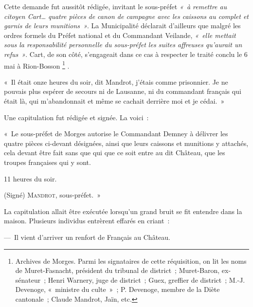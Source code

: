 \documentclass[french,twoside]{book} %
\newenvironment{quoteblock}%
  {\begin{quoting}}
  {\end{quoting}}
\newenvironment{quotebar}{%
    \def\FrameCommand{{\color{rubric!10!}\vrule width 0.5em} \hspace{0.9em}}%
    \def\OuterFrameSep{\itemsep} %
    \MakeFramed {\advance\hsize-\width \FrameRestore}
  }%
  {%
    \endMakeFramed
  }
\renewenvironment{quoteblock}%
  {%
    \savenotes
    \setstretch{0.9}
    \normalfont
    \begin{quotebar}
  }
  {%
    \end{quotebar}
    \spewnotes
  }
\begin{document}
\noindent Cette demande fut aussitôt rédigée, invitant le sous-préfet \emph{« à remettre au citoyen Cart… quatre pièces de canon de campagne avec les caissons au complet et garnis de leurs munitions »}. La Municipalité déclarait d’ailleurs que malgré les ordres formels du Préfet national et du Commandant Veilande, \emph{« elle mettait sous la responsabilité personnelle du sous-préfet les suites affreuses qu’aurait un refus »}. Cart, de son côté, s’engageait dans ce cas à respecter le traité conclu le 6 mai à Rion-Bosson \footnote{Archives de Morges. Parmi les signataires de cette réquisition, on lit les noms de Muret-Fasnacht, président du tribunal de district ; Muret-Baron, ex-sénateur ; Henri Warnery, juge de district ; Guex, greffier de district ; M.-J. Devenoge, « ministre du culte » ; P. Devenoge, membre de la Diète cantonale ; Claude Mandrot, Jaïn, etc.} .\par

\begin{quoteblock}
 \noindent « Il était onze heures du soir, dit Mandrot, j’étais comme prisonnier. Je ne pouvais plus espérer de secours ni de Lausanne, ni du commandant français qui était là, qui m’abandonnait et même se cachait derrière moi et je cédai. »
 \end{quoteblock}

\noindent Une capitulation fut rédigée et signée. La voici :\par

\begin{quoteblock}
 \noindent « Le sous-préfet de Morges autorise le Commandant Demney à délivrer les quatre pièces ci-devant désignées, ainsi que leurs caissons et munitions y attachés, cela devant être fait sans que qui que ce soit entre au dit Château, que les troupes françaises qui y sont.\par
 11 heures du soir.\par
 (Signé) {\scshape Mandrot}, sous-préfet. »
 \end{quoteblock}

\noindent La capitulation allait être exécutée lorsqu’un grand bruit se fit entendre dans la maison. Plusieurs individus entrèrent effarés en criant :\par
— Il vient d’arriver un renfort de Français au Château.\par
\end{document}
